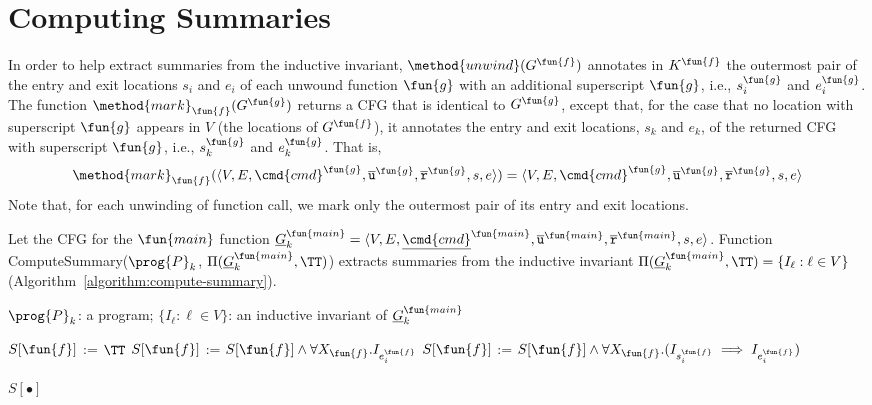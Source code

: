 
\section{Computing Summaries}\label{sec:computing-summary}
In order to help extract summaries from the inductive invariant,
$\method{unwind}(G^\fun{f})$ annotates in $K^\fun{f}$ the outermost pair of the
entry and exit locations ${s_i}$ and ${e_i}$ of each unwound function $\fun{g}$
with an additional superscript $\fun{g}$, i.e., $s_i^\fun{g}$ and $e_i^\fun{g}$.
The function $\method{mark}_\fun{f}(G^\fun{g})$ returns a CFG that is identical
to $G^\fun{g}$, except that, for the case that no location with superscript
$\fun{g}$ appears in $V$ (the locations of $G^\fun{f}$), it annotates the entry
and exit locations, $s_k$ and $e_k$, of the returned CFG with superscript
$\fun{g}$, i.e., $s_k^\fun{g}$ and $e_k^\fun{g}$.
That is,
\[
\method{mark}_\fun{f}(\langle
V, E,\cmd{cmd}^\fun{g}, \overline{\texttt{u}}^\fun{g}, \overline{\texttt{r}}^\fun{g},s,e \rangle) =
\langle V, E,\cmd{cmd}^\fun{g}, \overline{\texttt{u}}^\fun{g}, \overline{\texttt{r}}^\fun{g},s,e \rangle
\]
Note that, for each unwinding of function call,
we mark only the outermost pair of its entry and exit locations.


Let the CFG for the $\fun{main}$ function $\underline{G}^{\fun{main}}_k = \langle V, E, \underline{\cmd{cmd}}^{\fun{main}}, \overline{\mathtt{u}}^{\fun{main}}, \overline{\mathtt{r}}^{\fun{main}},s,e \rangle$.
Function ComputeSummary($\prog{P}_k$, $\Pi (\underline{G}^{\fun{main}}_k, \TT)$)
extracts summaries from the inductive invariant
$\Pi (\underline{G}^{\fun{main}}_k, \TT)= \{ I_\ell : \ell \in V\}$
(Algorithm~\ref{algorithm:compute-summary}).

\begin{algorithm}
\begin{doublespace}
  \KwIn
  {
    $\prog{P}_k$: a program;
    $\{ I_\ell : \ell \in V \}$: an inductive invariant of $\underline{G}^{\fun{main}}_k$
  }

  { 
    $S[\fun{f}]$ := $\TT$\;
    {
      {
        $S[\fun{f}]$ := $S[\fun{f}]\wedge \forall X_\fun{f}. I_{e_i^\fun{f}}$
      }
      \Else
      {
        $S[\fun{f}]$ := $S[\fun{f}]\wedge \forall X_\fun{f}. (I_{s_i^\fun{f}} \implies I_{e_i^\fun{f}})$
      }
    }
    
  }
 
  \Return $S[\bullet]$\;
\end{doublespace}
  \caption{
  $\textmd{ComputeSummary}(\prog{P}_k, \Pi (\underline{G}^{\fun{main}}_k, \TT))$}
  \label{algorithm:compute-summary}
\end{algorithm}

